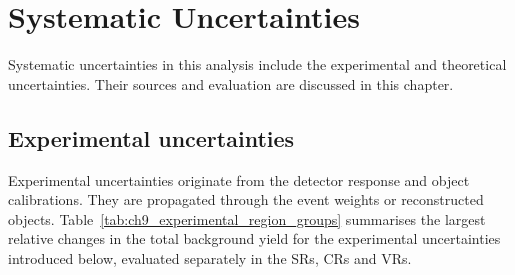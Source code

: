 \chapter{Systematic Uncertainties}
\label{chapter:systematics_uncertainties}

Systematic uncertainties in this analysis include the experimental and theoretical uncertainties.
Their sources and evaluation are discussed in this chapter.

\section{Experimental uncertainties}
\label{sec:ch9_experimental}

Experimental uncertainties originate from the detector response and object calibrations. They are propagated through the event weights or reconstructed objects.
Table~\ref{tab:ch9_experimental_region_groups} summarises the largest relative changes in the total background yield for the experimental uncertainties introduced below, evaluated separately in the SRs, CRs and VRs.

